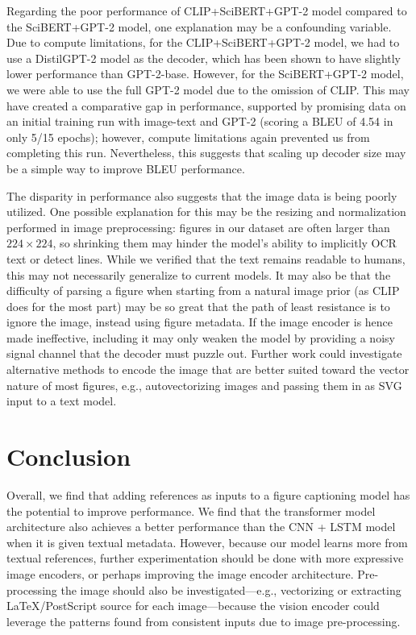 \documentclass{article}
\begin{document}
Regarding the poor performance of CLIP+SciBERT+GPT-2 model compared to the SciBERT+GPT-2 model, one explanation may be a confounding variable. Due to compute limitations, for the CLIP+SciBERT+GPT-2 model, we had to use a DistilGPT-2 model as the decoder, which has been shown to have slightly lower performance than GPT-2-base. However, for the SciBERT+GPT-2 model, we were able to use the full GPT-2 model due to the omission of CLIP. This may have created a comparative gap in performance, supported by promising data on an initial training run with image-text and GPT-2 (scoring a BLEU of 4.54 in only 5/15 epochs); however, compute limitations again prevented us from completing this run. Nevertheless, this suggests that scaling up decoder size may be a simple way to improve BLEU performance.

The disparity in performance also suggests that the image data is being poorly utilized. One possible explanation for this may be the resizing and normalization performed in image preprocessing: figures in our dataset are often larger than $224 \times 224$, so shrinking them may hinder the model's ability to implicitly OCR text or detect lines. While we verified that the text remains readable to humans, this may not necessarily generalize to current models. It may also be that the difficulty of parsing a figure when starting from a natural image prior (as CLIP does for the most part) may be so great that the path of least resistance is to ignore the image, instead using figure metadata. If the image encoder is hence made ineffective, including it may only weaken the model by providing a noisy signal channel that the decoder must puzzle out. Further work could investigate alternative methods to encode the image that are better suited toward the vector nature of most figures, e.g., autovectorizing images and passing them in as SVG input to a text model.

\section{Conclusion}

Overall, we find that adding references as inputs to a figure captioning model has the potential to improve performance. We find that the transformer model architecture also achieves a better performance than the CNN + LSTM model when it is given textual metadata. However, because our model learns more from textual references, further experimentation should be done with more expressive image encoders, or perhaps improving the image encoder architecture. Pre-processing the image should also be investigated---e.g., vectorizing or extracting LaTeX/PostScript source for each image---because the vision encoder could leverage the patterns found from consistent inputs due to image pre-processing.
\end{document}
